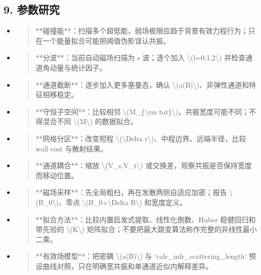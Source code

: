 \documentclass[UTF8,openany,11pt,fontset=fandol]{ctexbook}
\begin{document}
\subsection{\texorpdfstring{\textbf{9.
参数研究}}{9. 参数研究}}\label{ux53c2ux6570ux7814ux7a76-2}

\begin{itemize}
\item
  \begin{quote}
  **碰撞能**：扫描多个超低能，弱场极限应趋于背景有效力程行为；只在一个能量拟合可能把阈值伪影误认共振。
  \end{quote}
\item
  \begin{quote}
  **分波**：当前自动磁场扫描为 s 波；逐个加入
  \textbackslash(l=0,1,2\textbackslash) 并检查通道角动量与统计因子。
  \end{quote}
\item
  \begin{quote}
  **通道截断**：逐步加入更多塞曼态，确认
  \textbackslash(a(B)\textbackslash)、非弹性通道和特征相移稳定。
  \end{quote}
\item
  \begin{quote}
  **守恒子空间**：比较相邻 \textbackslash(M\_\{\textbackslash rm
  tot\}\textbackslash)，共振宽度可能不同；不得混合不同
  \textbackslash(M\textbackslash) 的数据拟合。
  \end{quote}
\item
  \begin{quote}
  **网格分区**：改变短程 \textbackslash(\textbackslash Delta
  r\textbackslash)、中程边界、远端半径，比较 wall cost 与散射结果。
  \end{quote}
\item
  \begin{quote}
  **通道耦合**：缩放 \textbackslash(V\_s,V\_t\textbackslash)
  或交换差，观察共振是否保持宽度而移动位置。
  \end{quote}
\item
  \begin{quote}
  **磁场采样**：先全局粗扫，再在发散两侧自适应加密；报告
  \textbackslash(B\_0\textbackslash)、零点
  \textbackslash(B\_0+\textbackslash Delta B\textbackslash) 和宽度定义。
  \end{quote}
\item
  \begin{quote}
  **拟合方法**：比较内置启发式提取、线性化倒数、Huber 稳健回归和带先验的
  \textbackslash(K\textbackslash)
  矩阵拟合；不要把最大跳变算法称作完整的非线性最小二乘。
  \end{quote}
\item
  \begin{quote}
  **有效场模型**：把密耦 \textbackslash(a(B)\textbackslash) 与
  `calc\_mfr\_scattering\_length`
  预设曲线对照，只在明确宽共振和单通道近似内解释差异。
  \end{quote}
\end{itemize}
\end{document}
